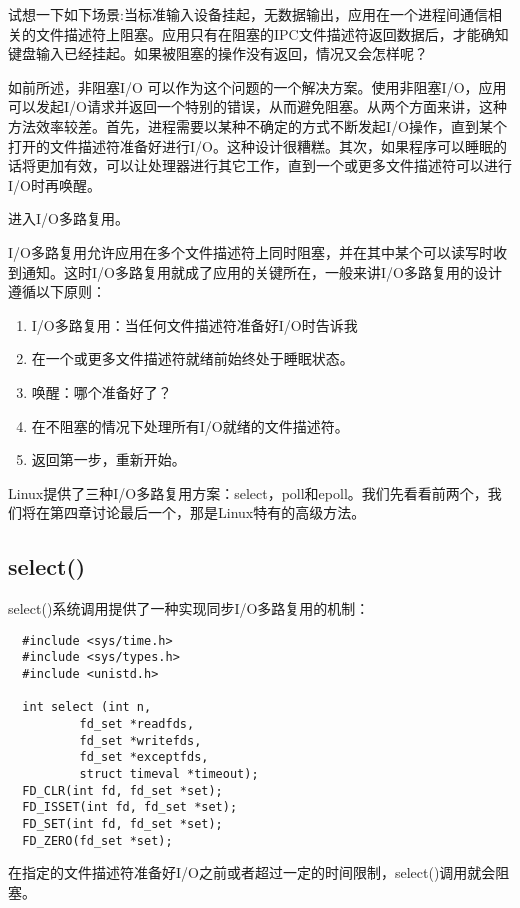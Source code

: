 试想一下如下场景:当标准输入设备挂起，无数据输出，应用在一个进程间通信相关的文件描述符上阻塞。应用只有在阻塞的IPC文件描述符返回数据后，才能确知键盘输入已经挂起。如果被阻塞的操作没有返回，情况又会怎样呢？

如前所述，非阻塞I/O 可以作为这个问题的一个解决方案。使用非阻塞I/O，应用可以发起I/O请求并返回一个特别的错误，从而避免阻塞。从两个方面来讲，这种方法效率较差。首先，进程需要以某种不确定的方式不断发起I/O操作，直到某个打开的文件描述符准备好进行I/O。这种设计很糟糕。其次，如果程序可以睡眠的话将更加有效，可以让处理器进行其它工作，直到一个或更多文件描述符可以进行I/O时再唤醒。

进入I/O多路复用。

I/O多路复用允许应用在多个文件描述符上同时阻塞，并在其中某个可以读写时收到通知。这时I/O多路复用就成了应用的关键所在，一般来讲I/O多路复用的设计遵循以下原则： 

\begin{enumerate}
\item I/O多路复用：当任何文件描述符准备好I/O时告诉我
\item 在一个或更多文件描述符就绪前始终处于睡眠状态。
\item 唤醒：哪个准备好了？
\item 在不阻塞的情况下处理所有I/O就绪的文件描述符。
\item 返回第一步，重新开始。 
\end{enumerate}

Linux提供了三种I/O多路复用方案：select，poll和epoll。我们先看看前两个，我们将在第四章讨论最后一个，那是Linux特有的高级方法。 

\subsection{select()}

select()系统调用提供了一种实现同步I/O多路复用的机制： 

\begin{lstlisting}
  #include <sys/time.h>
  #include <sys/types.h>
  #include <unistd.h>

  int select (int n,
 	      fd_set *readfds,
	      fd_set *writefds,
	      fd_set *exceptfds,
	      struct timeval *timeout);
  FD_CLR(int fd, fd_set *set);
  FD_ISSET(int fd, fd_set *set);
  FD_SET(int fd, fd_set *set);
  FD_ZERO(fd_set *set);
\end{lstlisting}

在指定的文件描述符准备好I/O之前或者超过一定的时间限制，select()调用就会阻塞。

